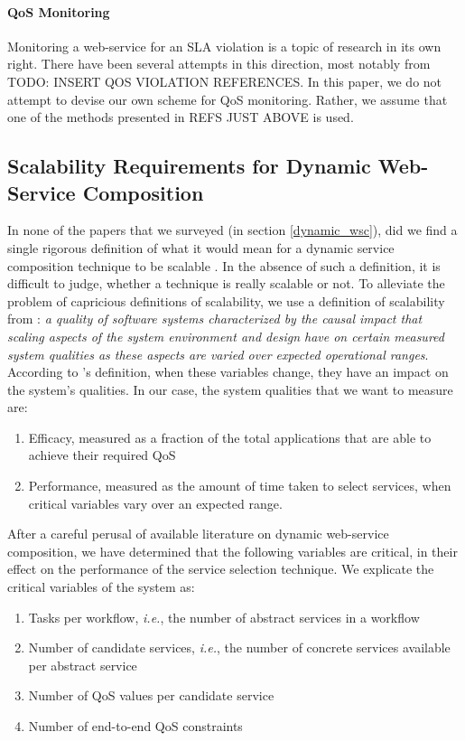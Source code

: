 \documentclass[10pt,journal,compsoc]{IEEEtran}
\begin{document}
\paragraph{QoS Monitoring} Monitoring a web-service for an SLA violation is a topic of research in its own right. There have been several attempts in this direction, most notably from {TODO: INSERT QOS VIOLATION REFERENCES}. In this paper, we do not attempt to devise our own scheme for QoS monitoring. Rather, we assume that one of the methods presented in {REFS JUST ABOVE} is used. 

\subsection{Scalability Requirements for Dynamic Web-Service Composition}
In none of the papers that we surveyed (in section \ref{dynamic_wsc}), did we find a single rigorous definition of what it would mean for a dynamic service composition technique to be scalable . In the absence of such a definition, it is difficult to judge, whether a technique is really scalable or not. To alleviate the problem of capricious definitions of scalability, we use a definition of scalability from \cite{Duboc2007}: \textit{a quality of software systems characterized by the causal impact that scaling aspects of the system environment and design have on certain measured system qualities as these aspects are varied over expected operational ranges}.\\
According to \cite{Duboc2007}'s definition, when these variables change, they have an impact on the system's qualities. In our case, the system qualities that we want to measure are:
	\begin{enumerate}
		\item Efficacy, measured as a fraction of the total applications that are able to achieve their required QoS
		\item Performance, measured as the amount of time taken to select services, when critical variables vary over an expected range.
	\end{enumerate}	 
After a careful perusal of available literature on dynamic web-service composition, we have determined that the following variables are critical, in their effect on the performance of the service selection technique. We explicate the critical variables of the system as:
	\begin{enumerate}
		\item Tasks per workflow, \textit{i.e.}, the number of abstract services in a workflow
		\item Number of candidate services, \textit{i.e.}, the number of concrete services available per abstract service
		\item Number of QoS values per candidate service
		\item Number of end-to-end QoS constraints
	\end{enumerate}
	
\end{document}
